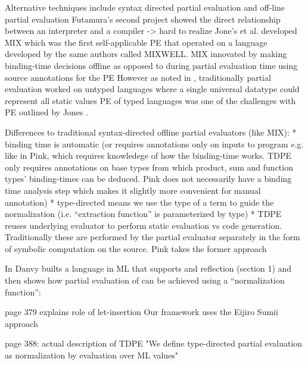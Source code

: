 \documentclass{article}
\theoremstyle{definition}
\begin{document}
Alternative techniques include syntax directed partial evaluation and off-line partial evaluation
Futamura's second project showed the direct relationship between an interpreter and a compiler -> hard to realize
Jone's et al. developed MIX which was the first self-applicable PE that operated on a language developed by the same authors called MIXWELL.
MIX innovated by making binding-time decisions offline as opposed to during partial evaluation time using source annotations for the PE
However as noted in \cite{grobauer2001second}, traditionally partial evaluation worked on untyped languages where a single universal datatype could represent all static values
PE of typed languages was one of the challenges with PE outlined by Jones \cite{jones1988challenging}.

Differences to traditional syntax-directed offline partial evaluators (like MIX):
* binding time is automatic (or requires annotations only on inputs to program e.g. like in Pink, which requires knowledege of how the binding-time works. TDPE only requires annotations on base types from which product, sum and function types' binding-times can be deduced. Pink does not necessarily have a binding time analysis step which makes it slightly more convenient for manual annotation)
* type-directed means we use the type of a term to guide the normalization (i.e. ``extraction function'' is parameterized by type)
* TDPE reuses underlying evaluator to perform static evaluation vs code generation. Traditionally these are performed by the partial evaluator separately in the form of symbolic computation on the source. Pink takes the former approach

In \cite{danvy1999type} Danvy builts a language in ML that supports and reflection (section 1) and then shows how partial evaluation of can be achieved using a ``normalization function'':

page 379 explains role of let-insertion
Our framework uses the Eijiro Sumii  approach

page 388: actual description of TDPE
"We  define  type-directed  partial  evaluation  as normalization  by  evaluation  over  ML values"
\end{document}
